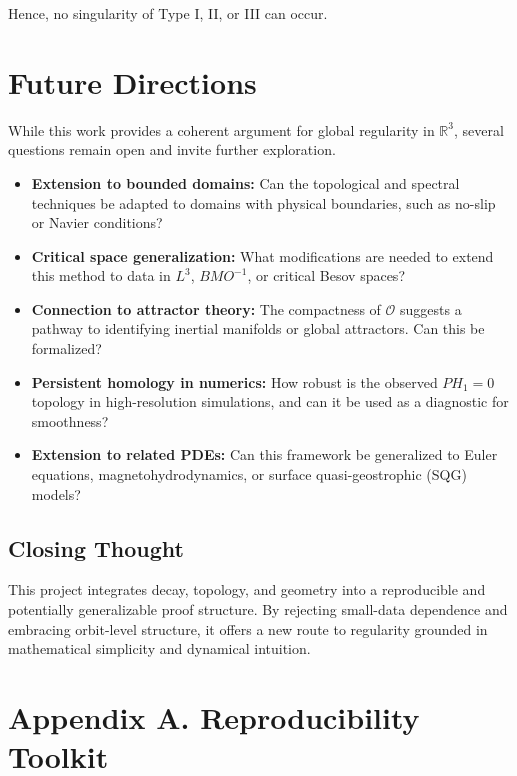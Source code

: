 \documentclass[11pt]{article}
\theoremstyle{definition}
\begin{document}
\noindent Hence, no singularity of Type I, II, or III can occur.

\bigskip
\section{Future Directions}
\label{sec:future}
While this work provides a coherent argument for global regularity in \( \mathbb{R}^3 \), several questions remain open and invite further exploration.

\begin{itemize}
  \item \textbf{Extension to bounded domains:} Can the topological and spectral techniques be adapted to domains with physical boundaries, such as no-slip or Navier conditions?
  \item \textbf{Critical space generalization:} What modifications are needed to extend this method to data in \( L^3 \), \( BMO^{-1} \), or critical Besov spaces?
  \item \textbf{Connection to attractor theory:} The compactness of \( \mathcal{O} \) suggests a pathway to identifying inertial manifolds or global attractors. Can this be formalized?
  \item \textbf{Persistent homology in numerics:} How robust is the observed \( PH_1 = 0 \) topology in high-resolution simulations, and can it be used as a diagnostic for smoothness?
  \item \textbf{Extension to related PDEs:} Can this framework be generalized to Euler equations, magnetohydrodynamics, or surface quasi-geostrophic (SQG) models?
\end{itemize}

\subsection*{Closing Thought}
This project integrates decay, topology, and geometry into a reproducible and potentially generalizable proof structure. By rejecting small-data dependence and embracing orbit-level structure, it offers a new route to regularity grounded in mathematical simplicity and dynamical intuition.



\section{Appendix A. Reproducibility Toolkit}
\label{sec:appendixA}
\end{document}
